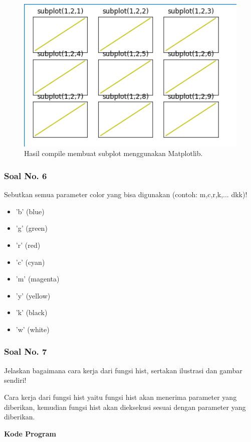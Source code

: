 \begin{figure}[H]
	\includegraphics[width=12cm]{figures/6/1174089/Teori/subplot.png}
	\centering
	\caption{Hasil compile membuat subplot menggunakan Matplotlib.}
\end{figure}

\subsubsection{Soal No. 6}
\hfill \break
Sebutkan semua parameter color yang bisa digunakan (contoh:  m,c,r,k,...  dkk)!

\begin{itemize}
	\item 'b' (blue)
	\item 'g' (green)
	\item 'r' (red)
	\item 'c' (cyan)
	\item 'm' (magenta)
	\item 'y' (yellow)
	\item 'k' (black)
	\item 'w' (white)
\end{itemize}

\subsubsection{Soal No. 7}
\hfill \break
Jelaskan bagaimana cara kerja dari fungsi hist, sertakan ilustrasi dan gambar sendiri!

\hfill \break
Cara kerja dari fungsi hist yaitu fungsi hist akan menerima parameter yang diberikan, kemudian fungsi hist akan dieksekusi sesuai dengan parameter yang diberikan.

\hfill \break
\textbf{Kode Program}

